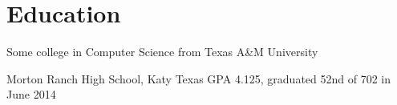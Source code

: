\documentclass{article}
\begin{document}
\section{Education}

Some college in Computer Science from Texas A\&M University

Morton Ranch High School, Katy Texas
GPA 4.125, graduated 52nd of 702 in June 2014


\end{document}
